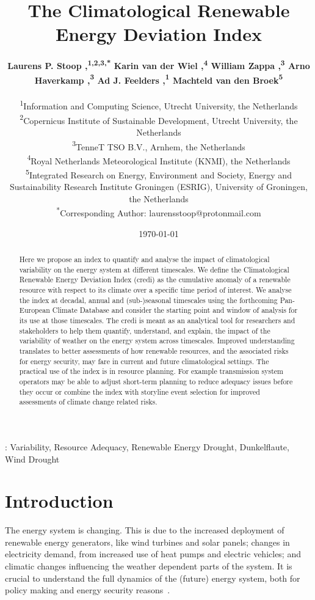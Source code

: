 \documentclass[a4paper,11pt]{extarticle}
\title{The Climatological Renewable Energy Deviation Index}
\author{%
\textbf{%
Laurens P. Stoop \orcidlink{0000-0003-2756-5653},\textcolor{Accent}{\textsuperscript{1,2,3,*}} %
Karin van der Wiel \orcidlink{0000-0001-9365-5759},\textcolor{Accent}{\textsuperscript{4}} %
William Zappa \orcidlink{0000-0001-6810-7224},\textcolor{Accent}{\textsuperscript{3}} %
Arno Haverkamp \orcidlink{0000-0001-6947-7892},\textcolor{Accent}{\textsuperscript{3}} %
Ad J. Feelders \orcidlink{0000-0003-4525-1949},\textcolor{Accent}{\textsuperscript{1}} %
Machteld van den Broek\orcidlink{0000-0003-1028-1742}\textcolor{Accent}{\textsuperscript{5}} }\\[0.5em]
\begin{small}%
\textcolor{Accent}{\textsuperscript{1}}Information and Computing Science, Utrecht University, the Netherlands \\ 
\textcolor{Accent}{\textsuperscript{2}}Copernicus Institute of Sustainable Development, Utrecht University, the Netherlands\\ 
\textcolor{Accent}{\textsuperscript{3}}TenneT TSO B.V., Arnhem, the Netherlands\\ 
\textcolor{Accent}{\textsuperscript{4}}Royal Netherlands Meteorological Institute (KNMI), the Netherlands\\ 
\textcolor{Accent}{\textsuperscript{5}}Integrated Research on Energy, Environment and Society, Energy and Sustainability Research Institute Groningen (ESRIG), University of Groningen, the Netherlands\\[0.5em] 
\textcolor{Accent}{\textsuperscript{*}}Corresponding Author: \textcolor{Accent}{laurensstoop@protonmail.com} \\ \end{small}
}
\date{\today}
\newcommand{\credi}[0]{{\sc credi}}
\begin{document}
\maketitle


\begin{abstract}
Here we propose an index to quantify and analyse the impact of climatological variability on the energy system at different timescales.
We define the Climatological Renewable Energy Deviation Index (\credi) as the cumulative anomaly of a renewable resource with respect to its climate over a specific time period of interest.
We analyse the index at decadal, annual and (sub-)seasonal timescales using the forthcoming Pan-European Climate Database and consider the starting point and window of analysis for its use at those timescales.
The \credi{} is meant as an analytical tool for researchers and stakeholders to help them quantify, understand, and explain, the impact of the variability of weather on the energy system across timescales. 
Improved understanding translates to better assessments of how renewable resources, and the associated risks for energy security, may fare in current and future climatological settings.
The practical use of the index is in resource planning. 
For example transmission system operators may be able to adjust short-term planning to reduce adequacy issues before they occur or combine the index with storyline event selection for improved assessments of climate change related risks.
\end{abstract}

\vspace{1pc}
: Variability, Resource Adequacy, Renewable Energy Drought, Dunkelflaute, Wind Drought
\vspace{1pc}

\section{Introduction}
The energy system is changing. 
This is due to the increased deployment of renewable energy generators, like wind turbines and solar panels; changes in electricity demand, from increased use of heat pumps and electric vehicles; and climatic changes influencing the weather dependent parts of the system. 
It is crucial to understand the full dynamics of the (future) energy system, both for policy making and energy security reasons~\autocite{craig2022disconnect}.
\end{document}
